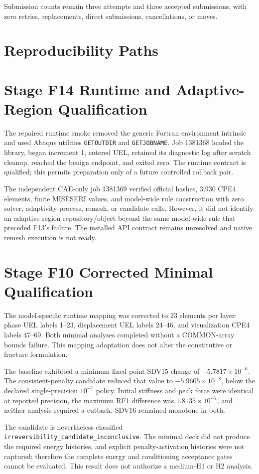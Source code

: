 Submission counts remain three attempts and three accepted submissions, with
zero retries, replacements, direct submissions, cancellations, or moves.

\section{Reproducibility Paths}
\section{Stage F14 Runtime and Adaptive-Region Qualification}

The repaired runtime smoke removed the generic Fortran environment intrinsic
and used Abaqus utilities \texttt{GETOUTDIR} and \texttt{GETJOBNAME}. Job
1381368 loaded the library, began increment 1, entered UEL, retained its
diagnostic log after scratch cleanup, reached the benign endpoint, and exited
zero. The runtime contract is qualified; this permits preparation only of a
future controlled rollback pair.

The independent CAE-only job 1381369 verified official hashes, 3,930 CPE4
elements, finite MISESERI values, and model-wide rule construction with zero
solver, adaptivity-process, remesh, or candidate calls. However, it did not
identify an adaptive-region repository/object beyond the same model-wide rule
that preceded F13's failure. The installed API contract remains unresolved and
native remesh execution is not ready.

\section{Stage F10 Corrected Minimal Qualification}
The model-specific runtime mapping was corrected to 23 elements per layer:
phase UEL labels 1--23, displacement UEL labels 24--46, and visualization
CPE4 labels 47--69. Both minimal analyses completed without a COMMON-array
bounds failure. This mapping adaptation does not alter the constitutive or
fracture formulation.

The baseline exhibited a minimum fixed-point SDV15 change of
$-5.7817\times10^{-6}$. The consistent-penalty candidate reduced that value
to $-5.9605\times10^{-8}$, below the declared single-precision
$10^{-7}$ policy. Initial stiffness and peak force were identical at reported
precision, the maximum RF1 difference was $1.8135\times10^{-7}$, and neither
analysis required a cutback. SDV16 remained monotone in both.

The candidate is nevertheless classified
\texttt{irreversibility\_candidate\_inconclusive}. The minimal deck did not
produce the required energy histories, and explicit penalty-activation
histories were not captured; therefore the complete energy and conditioning
acceptance gates cannot be evaluated. This result does not authorize a
medium-H1 or H2 analysis.

